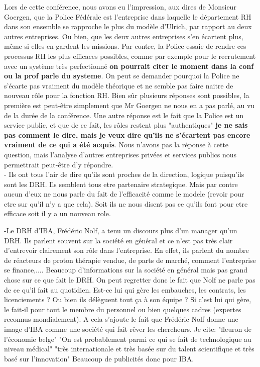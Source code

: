 Lors de cette conférence, nous avons eu l'impression, aux dires de Monsieur Goergen, que la Police Fédérale est l'entreprise dans laquelle le département RH dans son ensemble se rapproche le plus du modèle d'Ulrich, par rapport au deux autres entreprises. Ou bien, que les deux autres entreprises s'en écartent plus, même si elles en gardent les missions. Par contre, la Police essaie de rendre ces processus RH les plus efficaces possibles, comme par exemple pour le recrutement avec un système très perfectionné \textbf{on pourrait citer le moment dans la conf ou la prof parle du systeme}. On peut se demander pourquoi la Police ne s'écarte pas vraiment du modèle théorique et ne semble pas faire naitre de nouveau rôle pour la fonction RH. Bien sûr plusieurs réponses sont possibles, la première est peut-être simplement que Mr Goergen ne nous en a pas parlé, au vu de la durée de la conférence. Une autre réponse est le fait que la Police est un service public, et que de ce fait, les rôles restent plus "authentiques" \textbf{je ne sais pas comment le dire, mais je veux dire qu'ils ne s'écartent pas encore vraiment de ce qui a été acquis}. Nous n'avons pas la réponse à cette question, mais l'analyse d'autres entreprises privées et services publics nous permettrait peut-être d'y répondre. \\


- Ils ont tous l'air de dire qu'ils sont proches de la direction, logique puisqu'ils sont les DRH. Ils semblent tous etre partenaire strategique. Mais par contre aucun d'eux ne nous parle du fait de l'efficacité comme le modele (revoir pour etre sur qu'il n'y a que cela). Soit ils ne nous disent pas ce qu'ils font pour etre efficace soit il y a un nouveau role. 


-Le DRH d'IBA, Frédéric Nolf, a tenu un discours plus d'un manager qu'un DRH. Ils parlent souvent sur la société en général et ce n'est pas très clair d'entrevoir clairement son rôle dans l'entreprise. En effet, ils parlent du nombre de réacteurs de proton thérapie vendue, de parts de marché, comment l'entreprise se finance,.... Beaucoup d'informations sur la société en général mais pas grand chose sur ce que fait le DRH. On peut regretter donc le fait que Nolf ne parle pas de ce qu'il fait au quotidien. Est-ce lui qui gère les embauches, les contrats, les licenciements ? Ou bien ils délèguent tout ça à son équipe ? Si c'est lui qui gère, le fait-il pour tout le membre du personnel ou bien quelques cadres (expertes reconnus mondialement). 
 A cela s'ajoute le fait que Frédéric Nolf donne une image d'IBA comme une société qui fait rêver les chercheurs.
 Je cite:
 "fleuron de l'économie belge"
 "On est probablement parmi ce qui se fait de technologique au niveau médical"
 "très internationale  et très basée sur du talent scientifique et très basé sur l'innovation"
 Beaucoup de publicités donc pour IBA.
 
